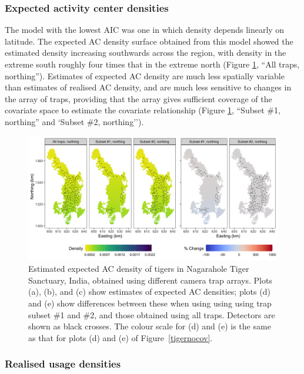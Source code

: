 \documentclass[10pt,a4paper]{article}
\begin{document}
\subsubsection{Expected activity center densities}

The model with the lowest AIC was one in which density depends linearly on latitude. The expected AC density surface obtained from this model showed the estimated density increasing southwards across the region, with density in the extreme south roughly four times that in the extreme north (Figure \ref{tigercov}, ``All traps, northing''). Estimates of expected AC density are much less spatially variable than estimates of realised AC density, and are much less sensitive to changes in the array of traps, providing that the array gives sufficient coverage of the covariate space to estimate the covariate relationship (Figure \ref{tigercov}, ``Subset \#1, northing'' and `Subset \#2, northing''). 

\begin{figure}[htbp]
\centering
\includegraphics[width=1\textwidth]{tiger_surfaces_covs.png}
\caption{Estimated expected AC density of tigers in Nagarahole Tiger Sanctuary, India, obtained using different camera trap arrays. Plots (a), (b), and (c) show estimates of expected AC densities; plots (d) and (e) show differences between these when using using using trap subset \#1 and \#2, and those obtained using all traps. Detectors are shown as black crosses. The colour scale for (d) and (e) is the same as that for plots (d) and (e) of Figure~\ref{tigernocov}.}
\label{tigercov}
\end{figure}

\subsubsection{Realised usage densities}
\end{document}
